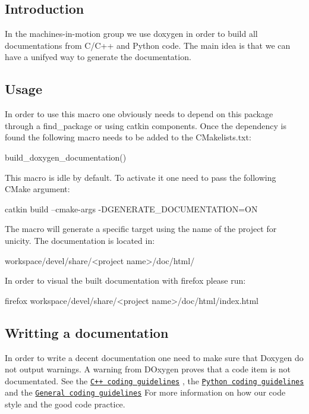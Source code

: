 \subsection*{Introduction}

In the machines-\/in-\/motion group we use doxygen in order to build all documentations from C/\+C++ and Python code. The main idea is that we can have a unifyed way to generate the documentation.

\subsection*{Usage}

In order to use this macro one obviously needs to depend on this package through a {\ttfamily find\+\_\+package} or using {\ttfamily catkin} components. Once the dependency is found the following macro needs to be added to the C\+Makelists.\+txt\+: \begin{DoxyVerb}build_doxygen_documentation()
\end{DoxyVerb}


This macro is idle by default. To activate it one need to pass the following C\+Make argument\+: \begin{DoxyVerb}catkin build --cmake-args -DGENERATE_DOCUMENTATION=ON
\end{DoxyVerb}


The macro will generate a specific target using the name of the project for unicity. The documentation is located in\+: \begin{DoxyVerb}workspace/devel/share/<project name>/doc/html/
\end{DoxyVerb}


In order to visual the built documentation with firefox please run\+: \begin{DoxyVerb}firefox workspace/devel/share/<project name>/doc/html/index.html
\end{DoxyVerb}


\subsection*{Writting a documentation}

In order to write a decent documentation one need to make sure that Doxygen do not output warnings. A warning from D\+Oxygen proves that a code item is not documentated. See the \href{https://machines-in-motion.github.io/code_documentation/ci_example_cpp/coding_guidelines_1.html}{\tt C++ coding guidelines} , the \href{https://machines-in-motion.github.io/code_documentation/ci_example_python/coding_guidelines_1.html}{\tt Python coding guidelines} and the \href{https://machines-in-motion.github.io/code_documentation/ci_example_cpp/coding_guidelines_0.html}{\tt General coding guidelines} For more information on how our code style and the good code practice.

